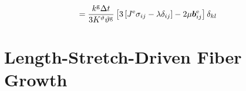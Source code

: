 \documentclass[10pt,letterpaper,oneside]{report}
\newcommand{\ten}[1]{\mbox{\boldmath $#1$}{}}
\newcommand{\scas}[1]{\mbox{{\scriptsize{${\rm{#1}}$}}}{}}
\begin{document}
\begin{align}
={}& \frac{k^{\scas{g}} \Delta t}{3 K^\vartheta \vartheta^{\scas{g}}} \left[ 3 \left[ J^{\scas{e}} \sigma_{ij} - \lambda \delta_{ij} \right] 
- 2 \mu \ten{b}^{\scas{e}}_{ij} \right] \delta_{kl} 
\end{align}


\section{Length-Stretch-Driven Fiber Growth}
\end{document}
